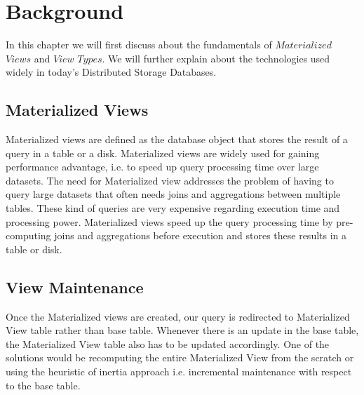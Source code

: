 \documentclass[11pt,a4paper,bibtotoc,idxtotoc,headsepline,footsepline,footexclude,BCOR12mm,DIV13]{scrbook}
\begin{document}


\chapter{Background}
\label{chap:background}

In this chapter we will first discuss about the fundamentals of $Materialized$ $Views$ and $View$ $Types$. We will further explain about the technologies used widely in today's Distributed Storage Databases. 

\section{Materialized Views}

Materialized views are defined as the database object that stores the result of a query in a table or a disk. Materialized views are widely used for gaining performance advantage, i.e. to speed up query processing time over large datasets. The need for Materialized view addresses the problem of having to query large datasets that often needs joins and aggregations between multiple tables. These kind of queries are very expensive regarding execution time and processing power. Materialized views speed up the query processing time by pre-computing joins and aggregations before execution and stores these results in a table or disk\cite{materializedview:oracle}. 

\section{View Maintenance}
Once the Materialized views are created, our query is redirected to Materialized View table rather than base table. Whenever there is an update in the base table, the Materialized View table also has to be updated accordingly. One of the solutions would be recomputing the entire Materialized View from the scratch or using the heuristic of inertia\cite{maintenance:materializedviews} approach i.e. incremental maintenance with respect to the base table.
\end{document}

